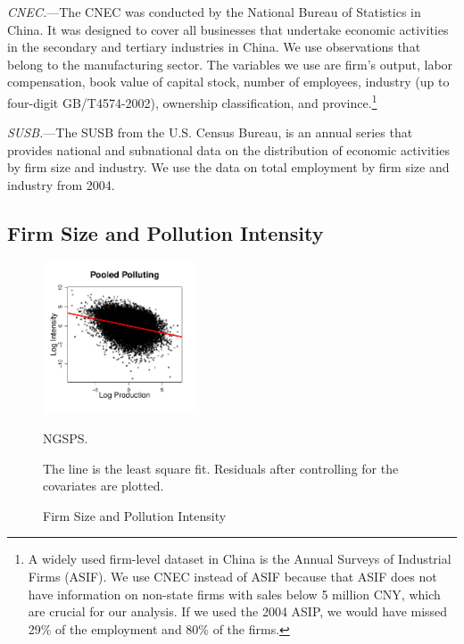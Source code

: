 \documentclass[AEJ]{AEA}
\begin{document}
\textit{CNEC.}---The CNEC was conducted by the National Bureau of Statistics in China. It was designed to cover {all} businesses that undertake economic activities in the secondary and tertiary industries in China. We use observations that belong to the manufacturing sector. The variables we use are firm's output, labor compensation, book value of capital stock, number of employees, industry (up to four-digit GB/T4574-2002), ownership classification, and province.\footnote{A widely used firm-level dataset in China is the Annual Surveys of Industrial Firms (ASIF). We use CNEC instead of ASIF because that ASIF does not have information on non-state firms with sales below 5 million CNY, which are crucial for our analysis. If we used the 2004 ASIP, we would have missed 29\% of the employment and 80\% of the firms.}

\textit{SUSB.}---The SUSB from the U.S. Census Bureau, is an annual series that provides national and subnational data on the distribution of economic activities by firm size and industry. We use the data on total employment by firm size and industry from 2004.

\subsection{Firm Size and Pollution Intensity}

\begin{figure}[t]
\caption{Firm Size and Pollution Intensity}
\label{fig:codscatter}
    \begin{center}
    \includegraphics[width=0.40\textwidth]{./Figures/pooled_intensity_size.pdf}
    \end{center}
    \begin{figurenotes}[Source]
        NGSPS.
    \end{figurenotes}
    \begin{figurenotes}
        The line is the least square fit. Residuals after controlling for the covariates are plotted.
    \end{figurenotes}
\end{figure}
\end{document}
